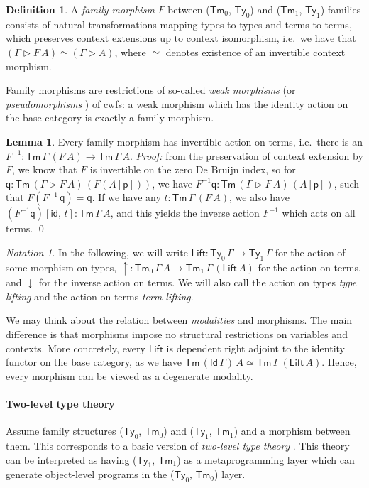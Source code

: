 \documentclass[a4paper,UKenglish,cleveref, autoref, thm-restate]{lipics-v2021}
\theoremstyle{remark}
\newtheorem{notation}{Notation}
\theoremstyle{definition}
\newtheorem{mydefinition}{Definition}
\newtheorem{mylemma}{Lemma}
\newcommand{\Ty}{\mathsf{Ty}}
\newcommand{\Tm}{\mathsf{Tm}}
\newcommand{\id}{\mathsf{id}}
\newcommand{\ext}{\triangleright}
\newcommand{\p}{\mathsf{p}}
\newcommand{\q}{\mathsf{q}}
\newcommand{\up}{\uparrow}
\newcommand{\down}{\downarrow}
\newcommand{\Lift}{\mathsf{Lift}}
\newcommand{\msf}[1]{\mathsf{#1}}
\begin{document}
\begin{mydefinition}
A \emph{family morphism} $F$ between ($\Tm_0$, $\Ty_0$) and ($\Tm_1$, $\Ty_1$)
families consists of natural transformations mapping types to types and terms to
terms, which preserves context extensions up to context isomorphism, i.e.\ we
have that $(\Gamma \ext F\,A) \simeq (\Gamma \ext A)$, where $\simeq$ denotes
existence of an invertible context morphism.
\end{mydefinition}

Family morphisms are restrictions of so-called \emph{weak morphisms}
\cite{dependentrightadjoints} (or \emph{pseudomorphisms}
\cite{kaposi2019gluing}) of cwfs: a weak morphism which has the identity action
on the base category is exactly a family morphism.

\begin{mylemma} Every family morphism has invertible action on terms, i.e.\ there
is an $F^{-1} : \Tm\,\Gamma\,(F\,A) \to \Tm\,\Gamma\,A$. \emph{Proof:} from the
preservation of context extension by $F$, we know that $F$ is invertible on the
zero De Bruijn index, so for $\q : \Tm\,(\Gamma \ext F\,A)\,(F (A[\p]))$, we
have $F^{-1}\q : \Tm\,(\Gamma \ext F\,A)\,(A[\p])$, such that $F (F^{-1}\,\q) =
\q$. If we have any $t : \Tm\,\Gamma\,(F\,A)$, we also have $(F^{-1}\q)[\id,\,t]
: \Tm\,\Gamma\,A$, and this yields the inverse action $F^{-1}$ which acts on all
terms. \qed
\end{mylemma}

\begin{notation}
In the following, we will write $\Lift : \Ty_0\,\Gamma \to \Ty_1\,\Gamma$ for
the action of some morphism on types, $\up : \Tm_0\,\Gamma\,A \to
\Tm_1\,\Gamma\,(\Lift\,A)$ for the action on terms, and $\down$ for the inverse
action on terms. We will also call the action on types \emph{type lifting}
and the action on terms \emph{term lifting}.
\end{notation}

We may think about the relation between \emph{modalities} and morphisms. The
main difference is that morphisms impose no structural restrictions on variables
and contexts. More concretely, every $\Lift$ is dependent right adjoint
\cite{dependentrightadjoints} to the identity functor on the base category, as
we have $\Tm\,(\msf{Id}\,\Gamma)\,A \simeq \Tm\,\Gamma\,(\Lift\,A)$. Hence,
every morphism can be viewed as a degenerate modality.

\paragraph{Two-level type theory}
Assume family structures ($\Ty_0$, $\Tm_0$) and ($\Ty_1$, $\Tm_1$) and a
morphism between them. This corresponds to a basic version of \emph{two-level
  type theory} \cite{twolevel}. This theory can be interpreted as having ($\Ty_1$,
$\Tm_1$) as a metaprogramming layer which can generate object-level programs in
the ($\Ty_0$, $\Tm_0$) layer.
\end{document}
